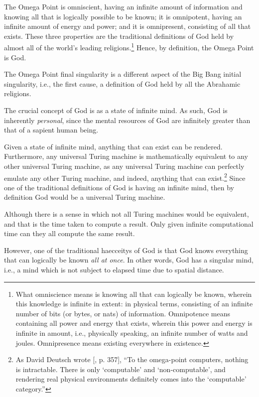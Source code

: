 \documentclass[letterpaper,12pt]{article}
\begin{document}
The Omega Point is omniscient, having an infinite amount of information and knowing all that is logically possible to be known; it is omnipotent, having an infinite amount of energy and power; and it is omnipresent, consisting of all that exists. These three properties are the traditional definitions of God held by almost all of the world's leading religions.\footnote{What omniscience means is knowing all that can logically be known, wherein this knowledge is infinite in extent: in physical terms, consisting of an infinite number of bits (or bytes, or nats) of information. Omnipotence means containing all power and energy that exists, wherein this power and energy is infinite in amount, i.e., physically speaking, an infinite number of watts and joules. Omnipresence means existing everywhere in existence.} Hence, by definition, the Omega Point is God.

The Omega Point final singularity is a different aspect of the Big Bang initial singularity, i.e., the first cause, a definition of God held by all the Abrahamic religions.

The crucial concept of God is as a state of infinite mind. As such, God is inherently \emph{personal}, since the mental resources of God are infinitely greater than that of a sapient human being.

Given a state of infinite mind, anything that can exist can be rendered. Furthermore, any universal Turing machine is mathematically equivalent to any other universal Turing machine, as any universal Turing machine can perfectly emulate any other Turing machine, and indeed, anything that can exist.\footnote{As David Deutsch wrote [, p. 357], ``To the omega-point computers, nothing is intractable. There is only `computable' and `non-computable', and rendering real physical environments definitely comes into the `computable' category.''} Since one of the traditional definitions of God is having an infinite mind, then by definition God would be a universal Turing machine.

Although there is a sense in which not all Turing machines would be equivalent, and that is the time taken to compute a result. Only given infinite computational time can they all compute the same result.

However, one of the traditional \glspl{haecceity} of God is that God knows everything that can logically be known \emph{all at once}. In other words, God has a singular mind, i.e., a mind which is not subject to elapsed time due to spatial distance.
\end{document}

